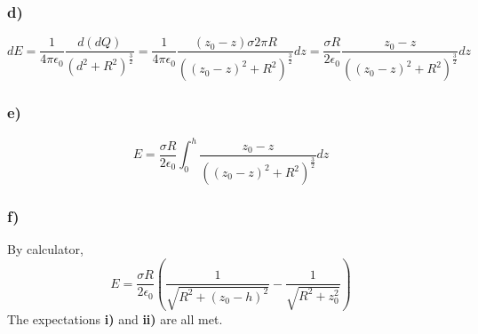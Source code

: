 \documentclass[../homework.tex]{subfiles}
\begin{document}
\subsubsection*{d)}
\begin{equation*}
    dE = \frac{1}{4\pi \epsilon_0} \frac{d(dQ)}{(d^2 + R^2)^\frac{3}{2}} = \frac{1}{4\pi \epsilon_0} \frac{(z_0 - z)\sigma 2 \pi R}{((z_0-z)^2 + R^2)^\frac{3}{2}} dz = \frac{\sigma R}{2\epsilon_0} \frac{z_0 - z}{((z_0-z)^2 + R^2)^\frac{3}{2}} dz
\end{equation*}
\subsubsection*{e)}
\begin{equation*}
    E = \frac{\sigma R}{2\epsilon_0} \int_{0}^{h} \frac{z_0 - z}{((z_0-z)^2 + R^2)^\frac{3}{2}} dz
\end{equation*}
\subsubsection*{f)}
\indent \indent By calculator,
\begin{equation*}
    E = \frac{\sigma R}{2\epsilon_0} \left(
    \frac{1}{\sqrt{R^2 + (z_0 - h)^2}} - \frac{1}{\sqrt{R^2 + z_0^2}}
    \right)
\end{equation*}
\indent The expectations \textbf{i)} and \textbf{ii)} are all met.
\end{document}
